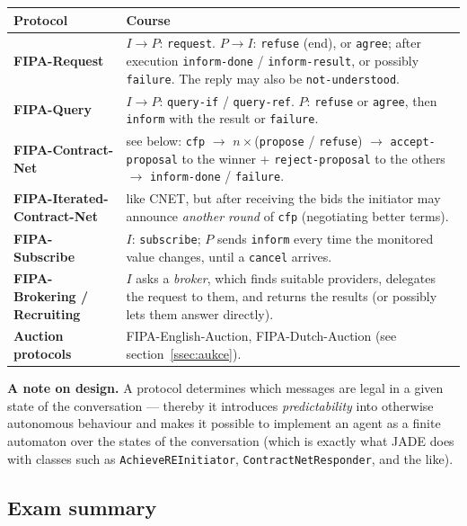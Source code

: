 \documentclass[11pt,a4paper]{article}
\theoremstyle{definition}
\begin{document}
\begin{center}\small
\begin{tabular}{p{} p{}}
\toprule
\textbf{Protocol} & \textbf{Course} \\
\midrule
\textbf{FIPA-Request}
  & $I \to P$: \texttt{request}. $P \to I$: \texttt{refuse} (end), or \texttt{agree};
    after execution \texttt{inform-done} / \texttt{inform-result}, or possibly \texttt{failure}.
    The reply may also be \texttt{not-understood}. \\
\textbf{FIPA-Query}
  & $I \to P$: \texttt{query-if} / \texttt{query-ref}. $P$: \texttt{refuse} or \texttt{agree},
    then \texttt{inform} with the result or \texttt{failure}. \\
\textbf{FIPA-Contract-Net}
  & see below: \texttt{cfp} $\to$ $n\times$(\texttt{propose} / \texttt{refuse}) $\to$
    \texttt{accept-proposal} to the winner + \texttt{reject-proposal} to the others $\to$
    \texttt{inform-done} / \texttt{failure}. \\
\textbf{FIPA-Iterated-Contract-Net}
  & like CNET, but after receiving the bids the initiator may announce \emph{another round} of
    \texttt{cfp} (negotiating better terms). \\
\textbf{FIPA-Subscribe}
  & $I$: \texttt{subscribe}; $P$ sends \texttt{inform} every time the monitored value changes,
    until a \texttt{cancel} arrives. \\
\textbf{FIPA-Brokering / Recruiting}
  & $I$ asks a \emph{broker}, which finds suitable providers, delegates the request to them, and
    returns the results (or possibly lets them answer directly). \\
\textbf{Auction protocols}
  & FIPA-English-Auction, FIPA-Dutch-Auction (see section~\ref{ssec:aukce}). \\
\bottomrule
\end{tabular}
\end{center}

\textbf{A note on design.} A protocol determines which messages are legal in a given state of the
conversation --- thereby it introduces \emph{predictability} into otherwise autonomous behaviour and
makes it possible to implement an agent as a finite automaton over the states of the conversation
(which is exactly what JADE does with classes such as
\texttt{AchieveREInitiator}, \texttt{ContractNetResponder}, and the like).

\subsection{Exam summary}
\end{document}

